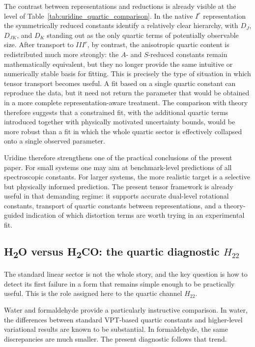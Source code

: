 The contrast between representations and reductions is already visible at the
level of Table~\ref{tab:uridine_quartic_comparison}. In the native $I^r$
representation the symmetrically reduced constants identify a relatively clear
hierarchy, with $D_J$, $D_{JK}$, and $D_K$ standing out as the only quartic
terms of potentially observable size. After transport to $III^r$, by
contrast, the anisotropic quartic content is redistributed much more strongly:
the $A$- and $S$-reduced constants remain mathematically equivalent, but they
no longer provide the same intuitive or numerically stable basis for fitting.
This is precisely the type of situation in which tensor transport becomes
useful. A fit based on a single quartic constant can reproduce the data, but
it need not return the parameter that would be obtained in a more complete
representation-aware treatment. The comparison with theory therefore suggests
that a constrained fit, with the additional quartic terms introduced together
with physically motivated uncertainty bounds, would be more robust than a fit
in which the whole quartic sector is effectively collapsed onto a single
observed parameter.

Uridine therefore strengthens one of the practical conclusions of the present
paper. For small systems one may aim at benchmark-level predictions of all
spectroscopic constants. For larger systems, the more realistic target is a
selective but physically informed prediction. The present tensor framework is
already useful in that demanding regime: it supports accurate dual-level
rotational constants, transport of quartic constants between representations,
and a theory-guided indication of which distortion terms are worth trying in
an experimental fit.

\subsection{H\textsubscript{2}O versus H\textsubscript{2}CO: the quartic diagnostic \texorpdfstring{$H_{22}$}{H22}}

The standard linear sector is not the whole story, and the key question is how
to detect its first failure in a form that remains simple enough to be
practically useful. This is the role assigned here to the quartic channel
$H_{22}$.

Water and formaldehyde provide a particularly instructive comparison. In
water, the differences between standard VPT-based quartic constants and
higher-level variational results are known to be substantial. In
formaldehyde, the same discrepancies are much smaller. The present diagnostic
follows that trend.

